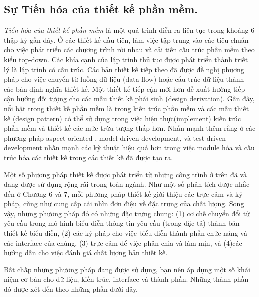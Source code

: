 \documentclass[./../SoftwareEngineering.tex]{subfiles}
\begin{document}
	\subsection{Sự Tiến hóa của thiết kế phần mềm.}
	\textit{Tiến hóa của thiết kế phần mềm} là một quá trình diễn ra liên tục trong khoảng 6 thập kỷ gần đây. Ở các thiết kế đầu tiên, làm việc tập trung vào các tiêu chuẩn cho việc phát triển các chương trình rời nhau và cải tiến cấu trúc phần mềm theo kiểu top-down. Các khía cạnh của lập trình thủ tục được phát triển thành triết lý là lập trình có cấu trúc. Các bản thiết kế tiếp theo đã được đề nghị phương pháp cho việc chuyển từ luồng dữ liệu (data flow) hoặc cấu trúc dữ liệu thành các bản định nghĩa thiết kế. Một thiết kế tiếp cận mới hơn đề xuất hướng tiếp cận hướng đối tượng cho các mẫu thiết kế phái sinh (design derivation). Gần đây, nổi bật trong thiết kế phần mềm là trong kiến trúc phần mềm \cites{Kru06} và các mẫu thiết kế (design pattern) có thể sử dụng trong việc hiện thực(implement) kiến trúc phần mềm và thiết kế các mức trừu tượng thấp hơn. Nhấn mạnh thêm rằng ở các phương pháp aspect-oriented , model-driven development, và test-driven development nhấn mạnh các kỹ thuật hiệu quả hơn trong việc module hóa và cấu trúc hóa các thiết kế trong các thiết kế đã được tạo ra. 
	
	
	Một số phương pháp thiết kế được phát triển từ những công trình ở trên đã và đang được sử dụng rộng rãi trong toàn ngành. Như một số phân tích được nhắc đến ở Chương 6 và 7, mỗi phương pháp thiết kế giới thiệu các trực cảm và ký pháp, cũng như cung cấp cái nhìn đơn điệu về đặc trưng của chất lượng. Song vậy, những phương pháp đó có những đặc trưng chung: (1) cơ chế chuyển đổi từ yêu cầu trong mô hình biểu diễn thông tin yêu cầu (trong đặc tả) thành bản thiết kế biểu diễn, (2) các ký pháp cho việc biểu diễn thành phần chức năng và các interface của chúng, (3) trực cảm để việc phân chia và làm mịn, và (4)các hướng dẫn cho việc đánh giá chất lượng bản thiết kế.
	
	Bất chấp những phương pháp đang được sử dụng, bạn nên áp dụng một số khái niệm cơ bản cho dữ liệu, kiến trúc, interface và thành phần. Những thành phần đó được xét đến theo những phần dưới đây.
	
\end{document}
